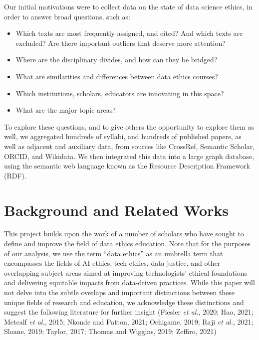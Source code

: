 \documentclass[
]{article}
\providecommand{\tightlist}{%
  \setlength{\itemsep}{0pt}\setlength{\parskip}{0pt}}
\begin{document}
Our initial motivations were to collect data on the state of data
science ethics, in order to answer broad questions, such as:

\begin{itemize}
\tightlist
\item
  Which texts are most frequently assigned, and cited? And which texts
  are excluded? Are there important outliers that deserve more
  attention?
\item
  Where are the disciplinary divides, and how can they be bridged?
\item
  What are similarities and differences between data ethics courses?
\item
  Which institutions, scholars, educators are innovating in this space?
\item
  What are the major topic areas?
\end{itemize}

To explore these questions, and to give others the opportunity to
explore them as well, we aggregated hundreds of syllabi, and hundreds of
published papers, as well as adjacent and auxiliary data, from sources
like CrossRef, Semantic Scholar, ORCID, and Wikidata. We then integrated
this data into a large graph database, using the semantic web language
known as the Resource Description Framework (RDF).

\hypertarget{background-and-related-works}{%
\section{Background and Related
Works}\label{background-and-related-works}}

This project builds upon the work of a number of scholars who have
sought to define and improve the field of data ethics education. Note
that for the purposes of our analysis, we use the term ``data ethics''
as an umbrella term that encompasses the fields of AI ethics, tech
ethics, data justice, and other overlapping subject areas aimed at
improving technologists' ethical foundations and delivering equitable
impacts from data-driven practices. While this paper will not delve into
the subtle overlaps and important distinctions between these unique
fields of research and education, we acknowledge these distinctions and
suggest the following literature for further insight (Fiesler \emph{et
al.}, 2020; Hao, 2021; Metcalf \emph{et al.}, 2015; Nkonde and Patton,
2021; Ochigame, 2019; Raji \emph{et al.}, 2021; Sloane, 2019; Taylor,
2017; Thomas and Wiggins, 2019; Zeffiro, 2021)
\end{document}
